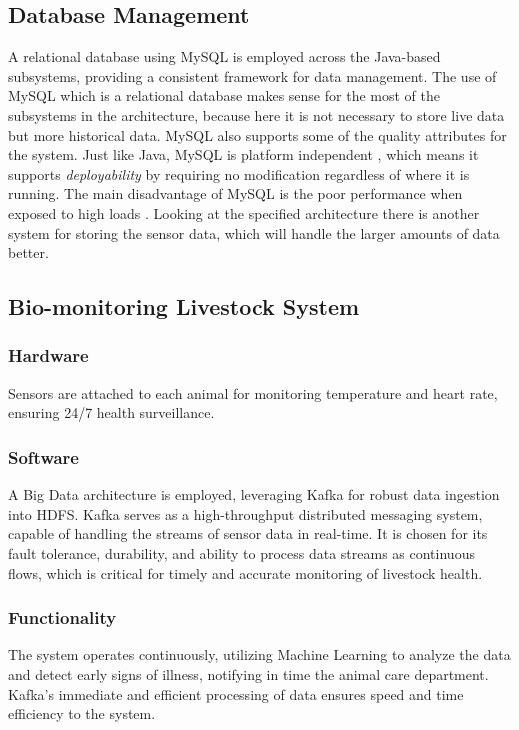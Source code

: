 \subsection{\textbf{Database Management}}
A relational database using MySQL is employed across the Java-based subsystems, providing a consistent framework for data management.
The use of MySQL which is a relational database makes sense for the most of the subsystems in the architecture, because here it is not necessary to store live data but more historical data. MySQL also supports some of the quality attributes for the system. Just like Java, MySQL is platform independent \cite{Blue}, which means it supports \textit{deployability} by requiring no modification regardless of where it is running.
The main disadvantage of MySQL is the poor performance when exposed to high loads \cite{Blue}. Looking at the specified architecture there is  another system for storing the sensor data, which will handle the larger amounts of data better.

\subsection{\textbf{Bio-monitoring Livestock System}}
\subsubsection{Hardware}
Sensors are attached to each animal for monitoring temperature and heart rate, ensuring 24/7 health surveillance.\vspace{2mm}
\subsubsection{Software}
A Big Data architecture is employed, leveraging Kafka for robust data ingestion into HDFS. Kafka serves as a high-throughput distributed messaging system, capable of handling the streams of sensor data in real-time. It is chosen for its fault tolerance, durability, and ability to process data streams as continuous flows, which is critical for timely and accurate monitoring of livestock health.\vspace{2mm}
\subsubsection{Functionality}
The system operates continuously, utilizing Machine Learning to analyze the data and detect early signs of illness, notifying in time the animal care department. Kafka's immediate and efficient processing of data ensures speed and time efficiency to the system.\vspace{2mm}


